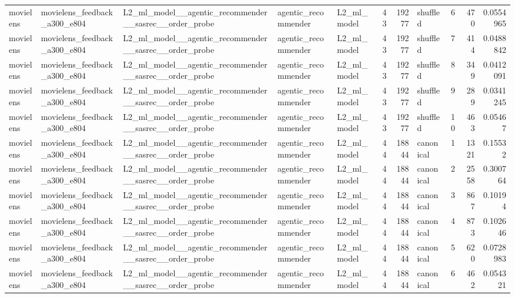 \begin{table}[htbp!]
\begin{tabular}{lllllrrlrrr}
movielens & movielens\_feedback\_a300\_e804 & L2\_ml\_model\_\_agentic\_recommender\_\_sasrec\_\_order\_probe & agentic\_recommender & L2\_ml\_model & 43 & 19277 & shuffled & 6 & 470 & 0.0554965 \\
movielens & movielens\_feedback\_a300\_e804 & L2\_ml\_model\_\_agentic\_recommender\_\_sasrec\_\_order\_probe & agentic\_recommender & L2\_ml\_model & 43 & 19277 & shuffled & 7 & 414 & 0.0488842 \\
movielens & movielens\_feedback\_a300\_e804 & L2\_ml\_model\_\_agentic\_recommender\_\_sasrec\_\_order\_probe & agentic\_recommender & L2\_ml\_model & 43 & 19277 & shuffled & 8 & 349 & 0.0412091 \\
movielens & movielens\_feedback\_a300\_e804 & L2\_ml\_model\_\_agentic\_recommender\_\_sasrec\_\_order\_probe & agentic\_recommender & L2\_ml\_model & 43 & 19277 & shuffled & 9 & 289 & 0.0341245 \\
movielens & movielens\_feedback\_a300\_e804 & L2\_ml\_model\_\_agentic\_recommender\_\_sasrec\_\_order\_probe & agentic\_recommender & L2\_ml\_model & 43 & 19277 & shuffled & 10 & 463 & 0.05467 \\
movielens & movielens\_feedback\_a300\_e804 & L2\_ml\_model\_\_agentic\_recommender\_\_sasrec\_\_order\_probe & agentic\_recommender & L2\_ml\_model & 44 & 18844 & canonical & 1 & 1321 & 0.15532 \\
movielens & movielens\_feedback\_a300\_e804 & L2\_ml\_model\_\_agentic\_recommender\_\_sasrec\_\_order\_probe & agentic\_recommender & L2\_ml\_model & 44 & 18844 & canonical & 2 & 2558 & 0.300764 \\
movielens & movielens\_feedback\_a300\_e804 & L2\_ml\_model\_\_agentic\_recommender\_\_sasrec\_\_order\_probe & agentic\_recommender & L2\_ml\_model & 44 & 18844 & canonical & 3 & 867 & 0.10194 \\
movielens & movielens\_feedback\_a300\_e804 & L2\_ml\_model\_\_agentic\_recommender\_\_sasrec\_\_order\_probe & agentic\_recommender & L2\_ml\_model & 44 & 18844 & canonical & 4 & 873 & 0.102646 \\
movielens & movielens\_feedback\_a300\_e804 & L2\_ml\_model\_\_agentic\_recommender\_\_sasrec\_\_order\_probe & agentic\_recommender & L2\_ml\_model & 44 & 18844 & canonical & 5 & 620 & 0.0728983 \\
movielens & movielens\_feedback\_a300\_e804 & L2\_ml\_model\_\_agentic\_recommender\_\_sasrec\_\_order\_probe & agentic\_recommender & L2\_ml\_model & 44 & 18844 & canonical & 6 & 462 & 0.054321 \\

\end{tabular}
\end{table}
